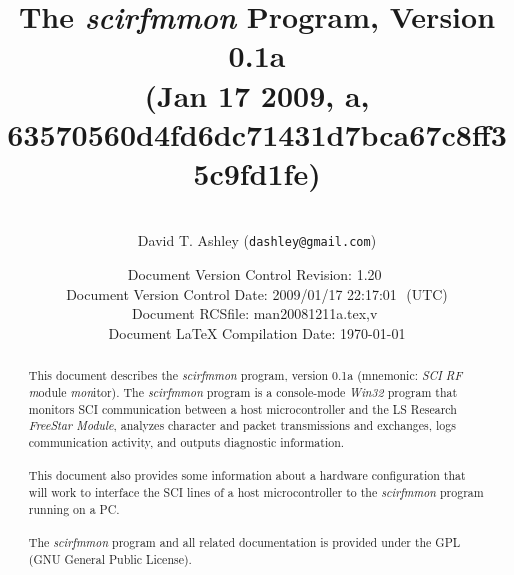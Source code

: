 \documentclass[letterpaper,10pt,titlepage]{article}
\newcommand{\productversion}{0.1a}
\newcommand{\productname}{scirfmmon}
\newcommand{\productnameemph}{\emph{\productname}}
\newcommand{\productcompiledate}{Jan 17 2009}
\newcommand{\productassertletter}{a}
\newcommand{\productversionhash}{63570560d4fd6dc71431d7bca67c8ff35c9fd1fe}
\begin{document}
\title{\textbf{\huge{The \productnameemph{} Program, Version \productversion{}}\\\vspace*{0.7cm}
       \normalsize{(\productcompiledate{}, \productassertletter{}, \productversionhash{})}}}
\author{\vspace*{3.0cm}\\%
   \small{David T. Ashley   (\texttt{dashley@gmail.com})}}
\date{\vspace*{3.5cm}\small{Document Version Control $ $Revision: 1.20 $ $ \\
      Document Version Control $ $Date: 2009/01/17 22:17:01 $ $ (UTC) \\
      Document $ $RCSfile: man20081211a.tex,v $ $ \\
      Document \LaTeX{} Compilation Date: \today{}}}
\maketitle
\begin{abstract}
This document describes the \productnameemph{} program,
version \productversion{} (mnemonic:  \emph{SCI} \emph{RF} \emph{m}odule
\emph{mon}itor).  The \productnameemph{} program is a console-mode \emph{Win32} program 
that monitors SCI communication between 
a host microcontroller and the LS Research \emph{FreeStar Module}, analyzes character and 
packet transmissions and exchanges, logs communication activity,
and outputs diagnostic information.
\\\\
This document also provides some information about a hardware configuration that will
work to interface the SCI lines of a host microcontroller to the
\productnameemph{} program running on a PC.
\\\\
The \productnameemph{} program and all related documentation
is provided under the GPL (GNU General
Public License).
\end{abstract}

\clearpage{}
\tableofcontents{}
\clearpage{}
\listoffigures
\clearpage{}

%
\setcounter{page}{1}
\end{document}
